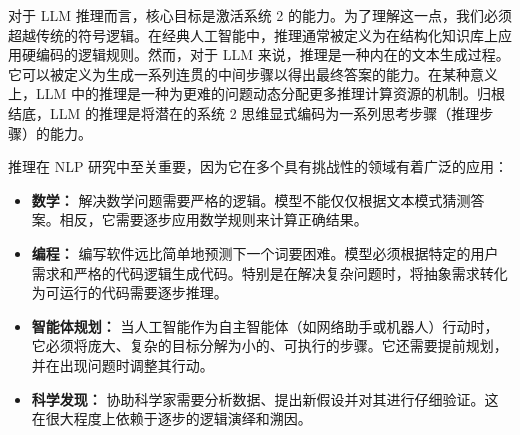 对于 LLM 推理而言，核心目标是激活系统 2 的能力。为了理解这一点，我们必须超越传统的符号逻辑。在经典人工智能中，推理通常被定义为在结构化知识库上应用硬编码的逻辑规则。然而，对于 LLM 来说，推理是一种内在的文本生成过程。它可以被定义为生成一系列连贯的中间步骤以得出最终答案的能力。在某种意义上，LLM 中的推理是一种为更难的问题动态分配更多推理计算资源的机制。归根结底，LLM 的推理是将潜在的系统 2 思维显式编码为一系列思考步骤（推理步骤）的能力。

推理在 NLP 研究中至关重要，因为它在多个具有挑战性的领域有着广泛的应用：

\begin{itemize}
\item \vspace{0.2cm} \textbf{数学：} 解决数学问题需要严格的逻辑。模型不能仅仅根据文本模式猜测答案。相反，它需要逐步应用数学规则来计算正确结果。
\item \vspace{0.2cm} \textbf{编程：} 编写软件远比简单地预测下一个词要困难。模型必须根据特定的用户需求和严格的代码逻辑生成代码。特别是在解决复杂问题时，将抽象需求转化为可运行的代码需要逐步推理。
\item \vspace{0.2cm} \textbf{智能体规划：} 当人工智能作为自主智能体（如网络助手或机器人）行动时，它必须将庞大、复杂的目标分解为小的、可执行的步骤。它还需要提前规划，并在出现问题时调整其行动。
\item \vspace{0.2cm} \textbf{科学发现：} 协助科学家需要分析数据、提出新假设并对其进行仔细验证。这在很大程度上依赖于逐步的逻辑演绎和溯因。
\end{itemize}
\vspace{0.3cm}




